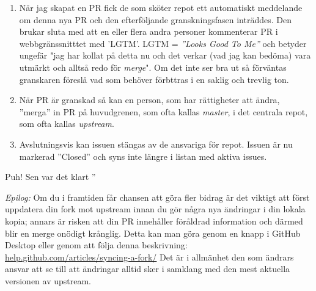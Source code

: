\begin{enumerate}
\item När jag skapat en PR fick de som sköter repot ett automatiskt meddelande om denna nya PR och den efterföljande granskningsfasen inträddes. Den brukar sluta med att en eller flera andra personer kommenterar PR i webbgränssnitttet med 'LGTM'. LGTM = \emph{''Looks Good To Me''} och betyder ungefär "jag har kollat på detta nu och det verkar (vad jag kan bedöma) vara utmärkt och alltså redo för \emph{merge}". Om det inte ser bra ut så förväntas granskaren föreslå vad som behöver förbttras i en saklig och trevlig ton.

\item När PR är granskad så kan en person, som har rättigheter att ändra, ''merga'' in PR på huvudgrenen, som ofta kallas \emph{master}, i det centrala repot, som ofta kallas \emph{upstream}.

\item Avslutningsvis kan issuen stängas av de ansvariga för repot. Issuen är nu markerad ''Closed'' och syns inte längre i listan med aktiva issues. 

\end{enumerate}

Puh! Sen var det klart \code{:)} ''

\vspace{1em}\noindent\emph{Epilog:} Om du i framtiden får chansen att göra fler bidrag är det viktigt att först uppdatera din fork mot upstream innan du gör några nya ändringar i din lokala kopia; annars är risken att din PR innehåller föråldrad information och därmed blir en merge onödigt krånglig. Detta kan man göra genom en knapp i GitHub Desktop eller genom att följa denna beskrivning: \href{https://help.github.com/articles/syncing-a-fork/}{help.github.com/articles/syncing-a-fork/} Det är i allmänhet den som ändrars ansvar att se till att ändringar alltid sker i samklang med den mest aktuella versionen av upstream.
